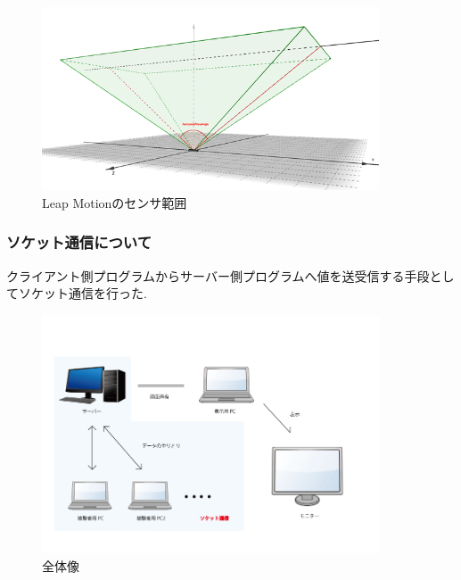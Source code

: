 \documentclass{funthesis}
\begin{document}
 \begin{figure}[H]
 \begin{center}
  \includegraphics[width=100mm]{./img/LeapAngle.png}
 \end{center}
 \caption{Leap Motionのセンサ範囲}
 \label{leap}
\end{figure}



\subsubsection{ソケット通信について}
クライアント側プログラムからサーバー側プログラムへ値を送受信する手段としてソケット通信を行った. 

\begin{figure}[H]
 \begin{center}
  \includegraphics[width=100mm]{./img/zentai.png}
 \end{center}
 \caption{全体像}
 \label{zentai}
\end{figure}
\end{document}
